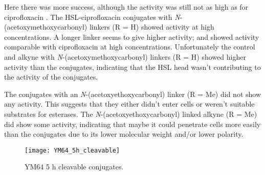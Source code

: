 Here there was more success, although the activity was still not as high as for ciprofloxacin .
The HSL-ciprofloxacin conjugates with \textit{N}-(acetoxymethoxycarbonyl) linkers (R = H) showed activity at high concentrations. A longer linker seems to give higher activity;  and  showed activity comparable with ciprofloxacin  at high concentrations.
Unfortunately the control  and alkyne  with \textit{N}-(acetoxymethoxycarbonyl) linkers (R = H) showed higher activity than the conjugates, indicating that the HSL head wasn't contributing to the activity of the conjugates.

The conjugates with an \textit{N}-(acetoxyethoxycarbonyl) linker (R = Me) did not show any activity. This suggests that they either didn't enter cells or weren't suitable substrates for esterases.
The \textit{N}-(acetoxyethoxycarbonyl) linked alkyne (R = Me) did show some activity, indicating that maybe it could penetrate cells more easily than the conjugates due to its lower molecular weight and/or lower polarity.

\begin{figure}[H]
	\begin{center}
		\texttt{[image: YM64\_5h\_cleavable]}
		\caption{YM64 5 h cleavable conjugates.\label{fgr:YM64_5h_cleavable}}
	\end{center}
\end{figure}
